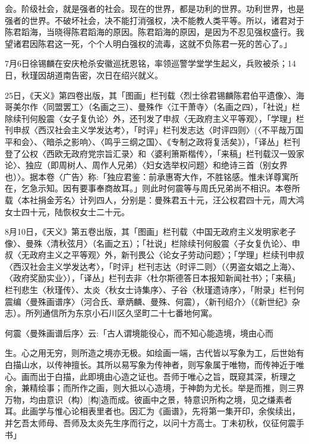 \noindent 会。阶级社会，就是强者的社会。现在的世界，都是功利的世界。功利世界，也是强者的世界。不破坏社会，决不能打消强权，决不能教人类平等。所以，诸君对于陈君蹈海，当晓得陈君蹈海的原因。陈君蹈海的原因，是因为不忍见强权盛行。我望诸君因陈君这一死，个个人明白强权的流毒，这就不负陈君一死的苦心了。」

7月6日徐锡麟在安庆枪杀安徽巡抚恩铭，率领巡警学堂学生起义，兵败被杀；14日，秋瑾因胡道南告密，次日在绍兴就义。

25日，《天义》第四卷出版，其「图画」栏刊载〈烈士徐君锡麟陈君伯平遗像〉、海哥美尔作〈同盟罢工〉（名画之三）、曼殊作〈江干萧寺〉（名画之四），「社说」栏除续刊何殷震〈女子复仇论〉外，还刊发了申叔〈无政府主义平等观〉，「学理」栏刊申叔〈西汉社会主义学发达考〉，「时评」栏刊发志达〈时评四则〉(〈不平哉万国平和会〉、〈暗杀之影响〉、〈鸣乎三纲之国〉、《专制之政将复活矣》），「译丛」栏刊登了公权〈西欧无政府党宗旨汇录〉和〈婆利箫斯楷传〉，「来稿」栏刊载汉一毁家论〉、独应（即周树人、周作人兄弟）〈妇女选举权问题〉和绝诗三首（别女界也）〉。据本卷〈广告〉称:「独应君鉴：前承惠寄大作，不胜铭感。惟未详尊寓所在，乞急示知。因有要事奉商故耳。」则此时何震等与周氏兄弟尚不相识。本卷所载〈本社捐金芳名〉计列四人，分别是：曼殊君五十元，汪公权君四十元，周大鸿女士四十元，陆恢权女士二十元。

8月10日，《天义》第五卷出版，其「图画」栏刊载〈中国无政府主义发明家老子像〉、曼殊〈清秋弦月〉（名画之五）；「社说」栏除续刊何殷震〈子女复仇论〉、申叔〈无政府主义之平等观〉外，新刊畏公〈论女子劳动问题〉；「学理」栏续刊申叔〈西汉社会主义学发达考〉，「时评」栏刊志达〈时评二则〉（〈男盗女娼之上海〉、〈政府奖励实业〉），「译丛」栏刊去非〈杜尔斯德答日本报知新闻社书〉；「来稿」栏刊悲生〈秋瑾传〉、太炎〈秋女士诗集序〉、子谷〈秋瑾遗诗序〉，「附录」栏刊何震编〈曼殊画谱序〉（河合氏、章炳麟、曼殊、何震），〈新刊绍介〉（《新世纪》杂志）。所列通信所为东京小石川区久坚町二十七番地何寓。

何震〈曼殊画谱后序〉云:「古人谓境能役心，而不知心能造境，境由心而


\noindent 生。心之用无穷，则所造之境亦无极。如绘画一端，古代皆以写象为工，后世始有白描山水，以传神擅长。其所以易写象为传神者，则写象属于唯物，而传神近于唯心。画而出于白描，此即境由心造之证也。吾师于唯心之旨，既窥其深，析理之余，兼精绘事；而所作之画，则大抵以心造境，于神韵为尤长。举是而推，则三界万物，均由意识（构）[构]造而成。彼画中之景，特意识所构之境，见之缣素者耳。此画学与惟心论相表里者也。因汇为《画谱》，先将第一集开印，余俟续出，并乞吾太师母、吾师及太炎先生序而行之，以问十方高士。丁未初秋，仪征何震手书」

